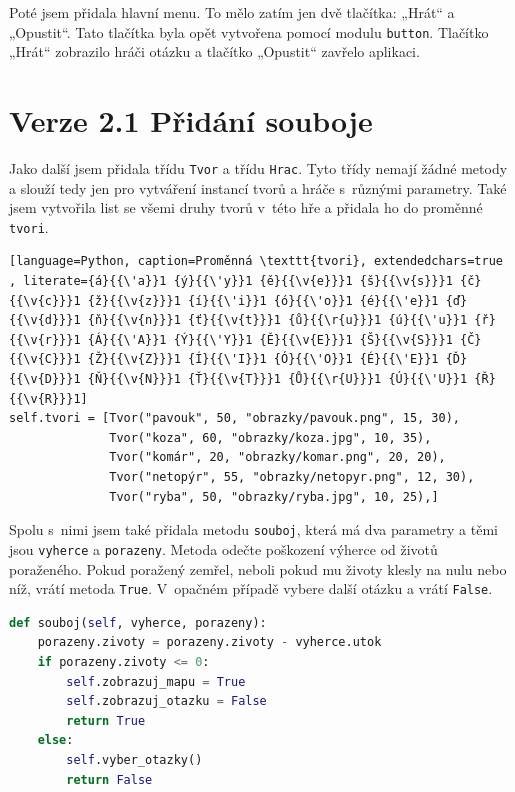 \documentclass[12pt]{report}
\begin{document}
Poté jsem přidala hlavní menu. To mělo zatím jen dvě tlačítka: „Hrát“ a „Opustit“. Tato tlačítka byla opět vytvořena pomocí modulu \texttt{button}. Tlačítko „Hrát“ zobrazilo hráči otázku a tlačítko „Opustit“ zavřelo aplikaci.\\

\section{Verze 2.1 Přidání souboje}

Jako další jsem přidala třídu \texttt{Tvor} a třídu \texttt{Hrac}. Tyto třídy nemají žádné metody a slouží tedy jen pro vytváření instancí tvorů a hráče s~různými parametry. Také jsem vytvořila list se všemi druhy tvorů v~této hře a přidala ho do proměnné \texttt{tvori}.

 \begin{lstlisting}[language=Python, caption=Proměnná \texttt{tvori}, extendedchars=true , literate={á}{{\'a}}1 {ý}{{\'y}}1 {ě}{{\v{e}}}1 {š}{{\v{s}}}1 {č}{{\v{c}}}1 {ž}{{\v{z}}}1 {í}{{\'i}}1 {ó}{{\'o}}1 {é}{{\'e}}1 {ď}{{\v{d}}}1 {ň}{{\v{n}}}1 {ť}{{\v{t}}}1 {ů}{{\r{u}}}1 {ú}{{\'u}}1 {ř}{{\v{r}}}1 {Á}{{\'A}}1 {Ý}{{\'Y}}1 {Ě}{{\v{E}}}1 {Š}{{\v{S}}}1 {Č}{{\v{C}}}1 {Ž}{{\v{Z}}}1 {Í}{{\'I}}1 {Ó}{{\'O}}1 {É}{{\'E}}1 {Ď}{{\v{D}}}1 {Ň}{{\v{N}}}1 {Ť}{{\v{T}}}1 {Ů}{{\r{U}}}1 {Ú}{{\'U}}1 {Ř}{{\v{R}}}1]
self.tvori = [Tvor("pavouk", 50, "obrazky/pavouk.png", 15, 30),
              Tvor("koza", 60, "obrazky/koza.jpg", 10, 35),
              Tvor("komár", 20, "obrazky/komar.png", 20, 20),
              Tvor("netopýr", 55, "obrazky/netopyr.png", 12, 30),
              Tvor("ryba", 50, "obrazky/ryba.jpg", 10, 25),]
\end{lstlisting}

 Spolu s~nimi jsem také přidala metodu \texttt{souboj}, která má dva parametry a těmi jsou \texttt{vyherce} a \texttt{porazeny}. Metoda odečte poškození výherce od životů poraženého. Pokud poražený zemřel, neboli pokud mu životy klesly na nulu nebo níž, vrátí metoda \texttt{True}. V~opačném případě vybere další otázku a vrátí \texttt{False}.
 
\begin{lstlisting}[language=Python, caption=Metoda \texttt{souboj}]
 def souboj(self, vyherce, porazeny):
    porazeny.zivoty = porazeny.zivoty - vyherce.utok
    if porazeny.zivoty <= 0:
        self.zobrazuj_mapu = True
        self.zobrazuj_otazku = False
        return True
    else:
        self.vyber_otazky()
        return False
\end{lstlisting}
 
\end{document}
